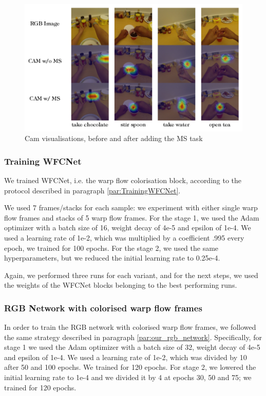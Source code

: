 \documentclass[10pt,twocolumn,letterpaper]{article}
\begin{document}
\begin{figure}
	\begin{center}
		\includegraphics[width=\linewidth]{grafici/cams_img.pdf}		
	\end{center}
	\caption{Cam visualisations, before and after adding the MS task}
	\label{fig:cams}
\end{figure}

\subsubsection{Training WFCNet}

We trained WFCNet, i.e. the warp flow colorisation block, according to the protocol described in paragraph \ref{par:TrainingWFCNet}.

We used 7 frames/stacks for each sample: we experiment with either single warp flow frames and stacks of 5 warp flow frames. For the stage 1, we used the Adam optimizer with a batch size of 16, weight decay of 4e-5 and epsilon of 1e-4. We used a learning rate of 1e-2, which was multiplied by a coefficient .995 every epoch, we trained for 100 epochs. For the stage 2, we used the same hyperparameters, but we reduced the initial learning rate to 0.25e-4.

Again, we performed three runs for each variant, and for the next steps, we used the weights of the WFCNet blocks belonging to the best performing runs.

\subsubsection{RGB Network with colorised warp flow frames}

In order to train the RGB network with colorised warp flow frames, we followed the same strategy described in paragraph \ref{par:our_rgb_network}. Specifically, for stage 1 we used the Adam optimizer with a batch size of 32, weight decay of 4e-5 and epsilon of 1e-4.  We used a learning rate of 1e-2, which was divided by 10 after 50 and 100 epochs. We trained for 120 epochs. For stage 2, we lowered the initial learning rate to 1e-4 and we divided it by 4 at epochs 30, 50 and 75; we trained for 120 epochs.
\end{document}
